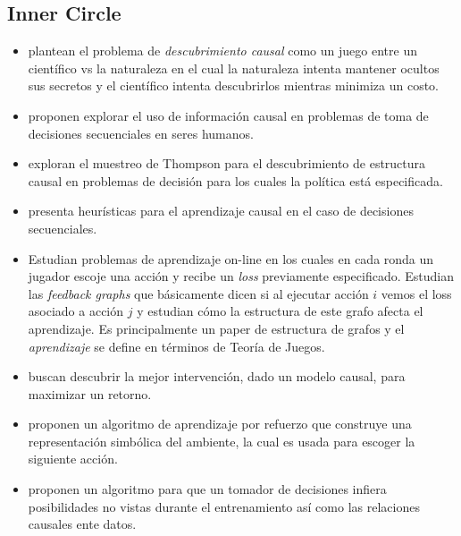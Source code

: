 \documentclass[11pt]{article}
\theoremstyle{plain}
\begin{document}
\subsection{Inner Circle}
\begin{itemize}
\item \cite{eberhardt2008causal} plantean el problema de \textit{descubrimiento causal} como un juego entre un científico vs la naturaleza en el cual la naturaleza intenta mantener ocultos sus secretos y el científico intenta descubrirlos mientras minimiza un costo. 
\item \cite{hagmayer2013repeated} proponen explorar el uso de información causal en problemas de toma de decisiones secuenciales en seres humanos.
\item \cite{ortega2014generalized} exploran el muestreo de Thompson para el descubrimiento de estructura causal en problemas de decisión para los cuales la política está especificada.
\item \cite{bramley2015staying} presenta heurísticas para el aprendizaje causal en el caso de decisiones secuenciales.
\item \cite{alon2015online} Estudian problemas de aprendizaje on-line en los cuales en cada ronda un jugador escoje una acción y recibe un \textit{loss} previamente especificado. Estudian las \textit{feedback graphs} que básicamente dicen si al ejecutar acción $i$ vemos el loss asociado a acción $j$ y estudian cómo la estructura de este grafo afecta el aprendizaje. Es principalmente un paper de estructura de grafos y el \textit{aprendizaje} se define en términos de Teoría de Juegos.
\item \cite{lattimoreNIPS2016} buscan descubrir la mejor intervención, dado un modelo causal, para maximizar un retorno.
\item \cite{garnelo2016towards} proponen un algoritmo de aprendizaje por refuerzo que construye una representación simbólica del ambiente, la cual es usada para escoger la siguiente acción.
\item \cite{innes2018reasoning} proponen un algoritmo para que un tomador de decisiones infiera posibilidades no vistas durante el entrenamiento así como las relaciones causales ente datos. 
\end{itemize}
\end{document}
